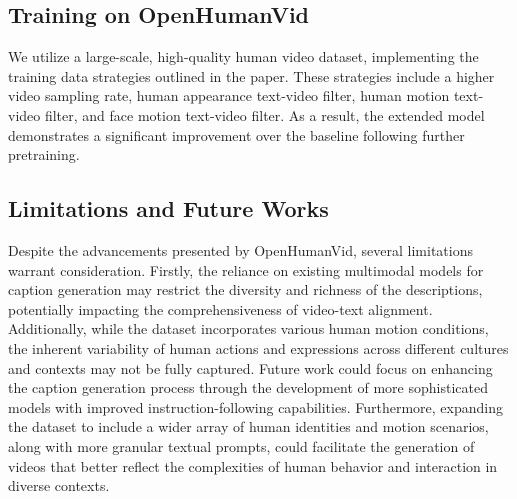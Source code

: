 \subsection{Training on OpenHumanVid}
We utilize a large-scale, high-quality human video dataset, implementing the training data strategies outlined in the paper. 
These strategies include a higher video sampling rate, human appearance text-video filter, human motion text-video filter, and face motion text-video filter. 
As a result, the extended model demonstrates a significant improvement over the baseline following further pretraining.




\subsection{Limitations and Future Works}
Despite the advancements presented by OpenHumanVid, several limitations warrant consideration. 
Firstly, the reliance on existing multimodal models for caption generation may restrict the diversity and richness of the descriptions, potentially impacting the comprehensiveness of video-text alignment. 
Additionally, while the dataset incorporates various human motion conditions, the inherent variability of human actions and expressions across different cultures and contexts may not be fully captured. 
Future work could focus on enhancing the caption generation process through the development of more sophisticated models with improved instruction-following capabilities. 
Furthermore, expanding the dataset to include a wider array of human identities and motion scenarios, along with more granular textual prompts, could facilitate the generation of videos that better reflect the complexities of human behavior and interaction in diverse contexts.

